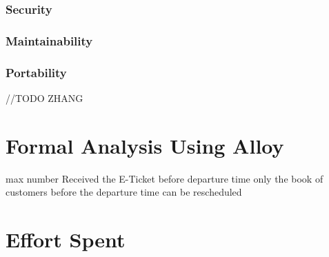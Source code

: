 \documentclass[a4paper,12pt]{report}
\begin{document}
\subsection{Security}
\subsection{Maintainability}
\subsection{Portability}



//TODO ZHANG
\chapter{Formal Analysis Using Alloy}

max number
Received the E-Ticket before departure time
only the book of customers before the departure time can be rescheduled



\chapter{Effort Spent}
\end{document}
